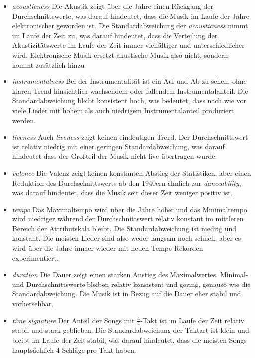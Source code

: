 \documentclass[conference]{IEEEtran}
\begin{document}
\begin{itemize}
\item{\textit{acousticness}} Die Akustik zeigt über die Jahre einen Rückgang der Durchschnittswerte, was darauf hindeutet, dass die Musik im Laufe der Jahre elektronischer geworden ist. Die Standardabweichung der \textit{acousticness} nimmt im Laufe der Zeit zu, was darauf hindeutet, dass die Verteilung der Akustizitätswerte im Laufe der Zeit immer vielfältiger und unterschiedlicher wird. Elektronische Musik ersetzt akustische Musik also nicht, sondern kommt zusätzlich hinzu. 

\item{\textit{instrumentalness}} Bei der Instrumentalität ist ein Auf-und-Ab zu sehen, ohne klaren Trend hinsichtlich wachsendem oder fallendem Instrumentalanteil. Die Standardabweichung bleibt konsistent hoch, was bedeutet, dass nach wie vor viele Lieder mit hohem als auch niedrigem Instrumentalanteil produziert werden.

\item{\textit{liveness}} Auch \textit{liveness} zeigt keinen eindeutigen Trend. Der Durchschnittswert ist relativ niedrig mit einer geringen Standardabweichung, was darauf hindeutet dass der Großteil der Musik nicht live übertragen wurde.

\item{\textit{valence}} Die Valenz zeigt keinen konstanten Abstieg der Statistiken, aber einen Reduktion des Durchschnittswerts ab den 1940ern ähnlich zur \textit{danceability}, was darauf hindeutet, dass die Musik seit dieser Zeit weniger positiv ist.

\item{\textit{tempo}} Das Maximaltempo wird über die Jahre höher und das Minimaltempo wird niedriger während der Durchschnittswert relativ konstant im mittleren Bereich der Attributskala bleibt. Die Standardabweichung ist niedrig und konstant. Die meisten Lieder sind also weder langsam noch schnell, aber es wird über die Jahre immer wieder mit neuen Tempo-Rekorden experimentiert.

\item{\textit{duration}} Die Dauer zeigt einen starken Anstieg des Maximalwertes. Minimal- und Durchschnittswerte bleiben relativ konsistent und gering, genauso wie die Standardabweichung. Die Musik ist in Bezug auf die Dauer eher stabil und vorhersehbar. 

\item{\textit{time signature}} Der Anteil der Songs mit $\frac 4 4$-Takt ist im Laufe der Zeit relativ stabil und stark geblieben. Die Standardabweichung der Taktart ist klein und bleibt im Laufe der Zeit stabil, was darauf hindeutet, dass die meisten Songs hauptsächlich 4 Schläge pro Takt haben.
\end{itemize}
\end{document}
